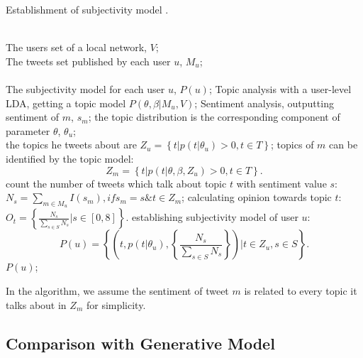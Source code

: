\begin{landscape}
\begin{algorithm}[htb] 
\caption{ Establishment of subjectivity model .} 
\label{alg1}
\begin{algorithmic}[0] %
\REQUIRE ~~\\ %
The users set of a local network, $ V $;\\
The tweets set published by each user $ u $, $ M_{u} $;\\
\ENSURE ~~\\ %
The subjectivity model for each user $ u $, $ P(u) $;
\STATE Topic analysis with a user-level LDA, getting a topic model $P(\theta,\beta|M_{u},V)$; 
\label{ alg1:topic }%
\label{alg1:sentiment}
\STATE Sentiment analysis, outputting sentiment of $ m $, $ s_{m} $;
\ENDFOR
{}
\STATE the topic distribution is the corresponding component of parameter $ \theta $, $ \theta_{u} $; \\
\STATE the topics he tweets about are $ Z_{u}= \left\lbrace t \vert p\left( t \vert \theta_{u} \right)>0, t \in T \right\rbrace $; 
\ENDFOR
{}
\STATE topics of $ m $ can be identified by the topic model:
\begin{equation}
\label{tweettopic}
Z_{m} =\left\lbrace t \vert p\left( t \vert \theta, \beta, Z_{u} \right)>0, t \in T \right\rbrace.
\end{equation}
\ENDFOR
{}
\STATE count the number of tweets which talk about topic $ t $ with sentiment value $ s $: $ N_{s}=\sum_{m \in M_{u}} I\left( s_{m} \right) ,  if  s_{m}=s \& t \in Z_{m} $;
\ENDFOR
\STATE calculating opinion towards topic $ t $: $ O_{t} = \left\{ \frac{N_{s}}{\sum_{s \in S} N_{s}} |s \in [0,8] \right\}  $.
\ENDFOR
\STATE establishing subjectivity model of user $ u $:
\begin{equation}
\label{subuser}
P\left( u \right)= \left\lbrace \left( t, p\left( t \vert \theta_{u} \right), \left\{ \frac{N_{s}}{\sum_{s \in S} N_{s}} \right\}  \right)  \vert t \in Z_{u}, s \in S  \right\rbrace.
\end{equation}
\RETURN $P(u)$; %
\end{algorithmic}
\end{algorithm}
In the algorithm,  we assume the sentiment of tweet $ m $ is related to every topic it talks about in $ Z_{m} $ for simplicity.

\subsection{Comparison with Generative Model}
\label{comparison}


\end{landscape}
